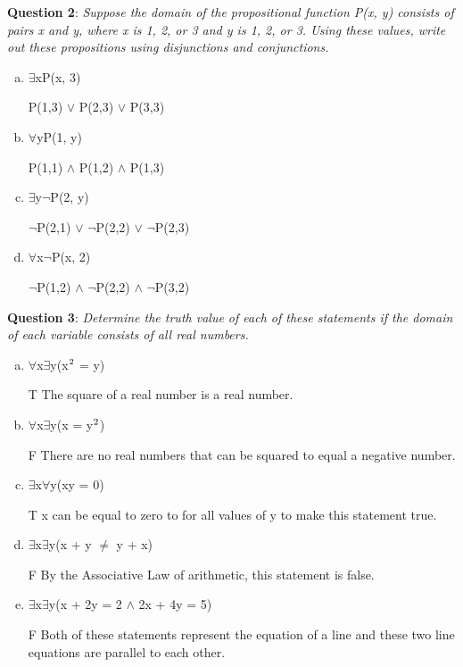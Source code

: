 \documentclass{article} %
\newcommand{\question}[2][]{\begin{flushleft}
        \textbf{Question #1}: \textit{#2}

\end{flushleft}}
\begin{document}
    \question[2]{Suppose the domain of the propositional function P(x, y) consists of pairs x and y, where x is 1, 2, or 3 and y is 1, 2, or 3. Using these values, write out these propositions using disjunctions and conjunctions.}
    \begin{enumerate}[a)]
      \item {$\exists$xP(x, 3)}
      
      P(1,3) $\lor$ P(2,3) $\lor$ P(3,3)
      
      \item {$\forall$yP(1, y)}
      
      P(1,1) $\land$ P(1,2) $\land$ P(1,3)

      \item {$\exists$y$\neg$P(2, y)}
      
      $\neg$P(2,1) $\lor$ $\neg$P(2,2) $\lor$ $\neg$P(2,3)

      \item {$\forall$x$\neg$P(x, 2)}
      
      $\neg$P(1,2) $\land$ $\neg$P(2,2) $\land$ $\neg$P(3,2)
    \end{enumerate}

  \question[3]{Determine the truth value of each of these statements if the domain of each
  variable consists of all real numbers.}
  \begin{enumerate}[a)]
    \item {$\forall$x$\exists$y(x$\textsuperscript{2}$ = y)}
    
    T The square of a real number is a real number.

    \item {$\forall$x$\exists$y(x = y$\textsuperscript{2}$)}
    
    F There are no real numbers that can be squared to equal a negative number.
    \item {$\exists$x$\forall$y(xy = 0)}
    
    T x can be equal to zero to for all values of y to make this statement true.
    \item {$\exists$x$\exists$y(x + y $\neq$ y + x)}
    
    F By the Associative Law of arithmetic, this statement is false.
    \item {$\exists$x$\exists$y(x + 2y = 2 $\land$ 2x + 4y = 5)} 
    
    F Both of these statements represent the equation of a line and these two line equations are parallel to each other.
    
  \end{enumerate}
\end{document}

